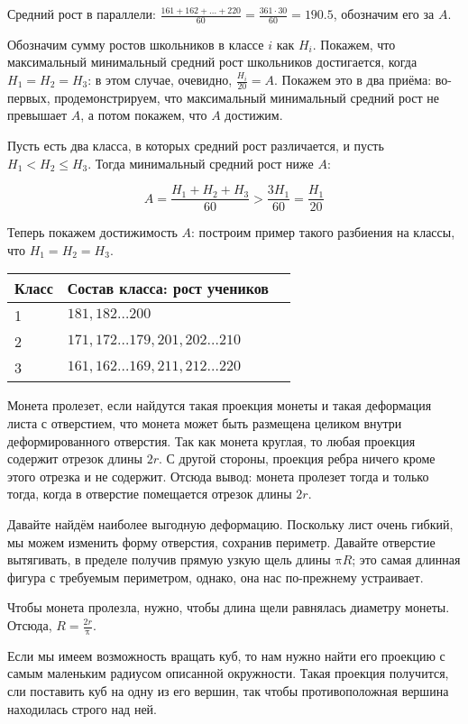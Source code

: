 \begin{itemize}
\itA Средний рост в параллели: $\frac{161 + 162 + \ldots + 220}{60} = \frac{361\cdot 30}{60} = 190.5$,
обозначим его за $A$.

Обозначим сумму ростов школьников в классе $i$ как $H_i$. Покажем, что максимальный 
минимальный средний рост школьников достигается, когда $H_1 = H_2 = H_3$: в этом случае,
очевидно, $\frac{H_i}{20} = A$. Покажем это в два приёма: во-первых, продемонстрируем,
что максимальный минимальный средний рост не превышает $A$, а потом покажем, что
$A$ достижим.

Пусть есть два класса, в которых средний рост различается, и пусть $H_1 < H_2 \le H_3$. 
Тогда минимальный средний рост ниже $A$: 

$$A = \frac{H_1 + H_2 + H_3}{60} > \frac{3H_1}{60} = \frac{H_1}{20}$$

Теперь покажем достижимость $A$: построим пример такого разбиения на классы,
что $H_1 = H_2 = H_3$.

\begin{center}\begin{tabular}{lll}
Класс & Состав класса: рост учеников \\
\hline
1 & $181, 182 \ldots 200$\\
2 & $171, 172 \ldots 179, 201, 202 \ldots 210$ \\
3 & $161, 162 \ldots 169, 211, 212 \ldots 220$
\end{tabular}\end{center}

\itB Монета пролезет, если найдутся такая проекция монеты и такая деформация 
листа с отверстием, что монета может быть размещена целиком внутри деформированного
отверстия. Так как монета круглая, то любая проекция содержит отрезок длины $2r$. 
С другой стороны, проекция ребра ничего кроме этого отрезка и не содержит. 
Отсюда вывод: монета пролезет тогда и только тогда, когда в отверстие помещается 
отрезок длины $2r$.

Давайте найдём наиболее выгодную деформацию.
Поскольку лист очень гибкий, мы можем изменить форму отверстия, сохранив периметр.
Давайте отверстие вытягивать, в пределе получив прямую узкую щель длины $\text{π}R$; это
самая длинная фигура с требуемым периметром, однако, она нас по-прежнему устраивает.

Чтобы монета пролезла, нужно, чтобы длина щели равнялась диаметру монеты. Отсюда, $R = \frac{2r}{\text{π}}$.

\itC Если мы имеем возможность вращать куб, то нам нужно найти его проекцию с самым маленьким
радиусом описанной окружности. Такая проекция получится, сли поставить куб на одну из
его вершин, так чтобы противоположная вершина находилась строго над ней.


\end{itemize}
